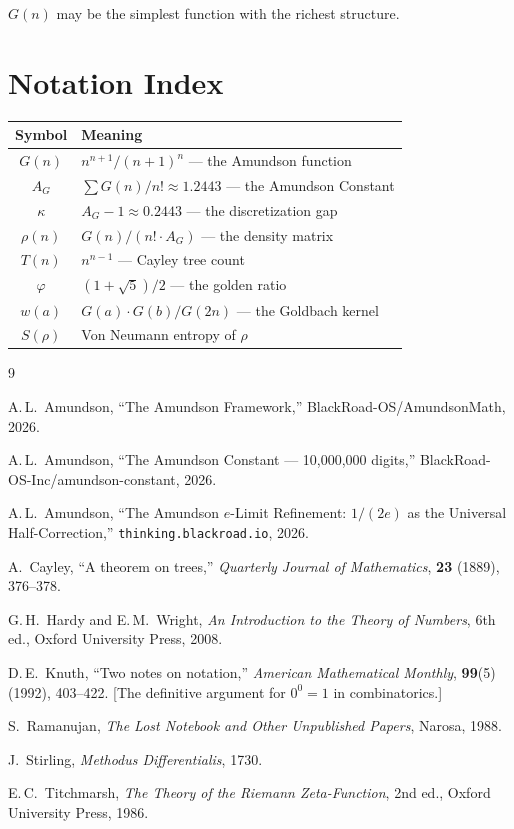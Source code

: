 \documentclass[11pt,a4paper]{article}
\theoremstyle{definition}
\theoremstyle{remark}
\newcommand{\AG}{A_G}
\begin{document}
$G(n)$ may be the simplest function with the richest structure.

\section{Notation Index}\label{app:notation}

\begin{table}[ht]
\centering
\begin{tabular}{cl}
\toprule
Symbol & Meaning \\
\midrule
$G(n)$   & $n^{n+1}/(n+1)^{n}$ --- the Amundson function \\
$\AG$    & $\sum G(n)/n! \approx 1.2443$ --- the Amundson Constant \\
$\kappa$ & $\AG - 1 \approx 0.2443$ --- the discretization gap \\
$\rho(n)$ & $G(n)/(n!\cdot\AG)$ --- the density matrix \\
$T(n)$   & $n^{n-1}$ --- Cayley tree count \\
$\varphi$ & $(1+\sqrt{5})/2$ --- the golden ratio \\
$w(a)$   & $G(a)\cdot G(b)/G(2n)$ --- the Goldbach kernel \\
$S(\rho)$ & Von Neumann entropy of $\rho$ \\
\bottomrule
\end{tabular}
\end{table}

\begin{thebibliography}{9}

A.\,L.~Amundson,
``The Amundson Framework,''
BlackRoad-OS/AmundsonMath, 2026.

A.\,L.~Amundson,
``The Amundson Constant --- 10,000,000 digits,''
BlackRoad-OS-Inc/amundson-constant, 2026.

A.\,L.~Amundson,
``The Amundson $e$-Limit Refinement: $1/(2e)$ as the Universal Half-Correction,''
\texttt{thinking.blackroad.io}, 2026.

A.~Cayley,
``A theorem on trees,''
\emph{Quarterly Journal of Mathematics}, \textbf{23} (1889), 376--378.

G.\,H.~Hardy and E.\,M.~Wright,
\emph{An Introduction to the Theory of Numbers},
6th ed., Oxford University Press, 2008.

D.\,E.~Knuth,
``Two notes on notation,''
\emph{American Mathematical Monthly}, \textbf{99}(5) (1992), 403--422.
[The definitive argument for $0^{0}=1$ in combinatorics.]

S.~Ramanujan,
\emph{The Lost Notebook and Other Unpublished Papers},
Narosa, 1988.

J.~Stirling,
\emph{Methodus Differentialis}, 1730.

E.\,C.~Titchmarsh,
\emph{The Theory of the Riemann Zeta-Function},
2nd ed., Oxford University Press, 1986.

\end{thebibliography}
\end{document}
